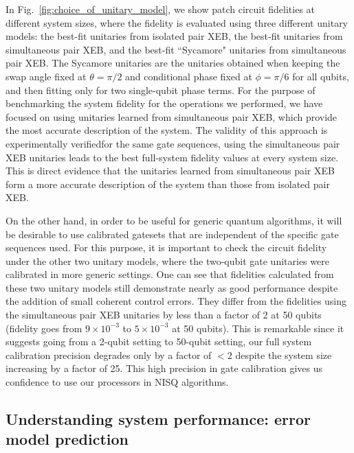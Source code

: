 In Fig.~\ref{fig:choice_of_unitary_model}, we show patch circuit fidelities at different system sizes, where the fidelity is evaluated using three different unitary models: the best-fit unitaries from isolated pair XEB, the best-fit unitaries from simultaneous pair XEB, and the best-fit ``Sycamore" unitaries from simultaneous pair XEB. The Sycamore unitaries are the unitaries obtained when keeping the swap angle fixed at $\theta = \pi/2$ and conditional phase fixed at $\phi = \pi/6$ for all qubits, and then fitting only for two single-qubit phase terms. For the purpose of benchmarking the system fidelity for the operations we performed, we have focused on using unitaries learned from simultaneous pair XEB, which provide the most accurate description of the system. The validity of this approach is experimentally verified\textemdash for the same gate sequences, using the simultaneous pair XEB unitaries leads to the best full-system fidelity values at every system size. This is direct evidence that the unitaries learned from simultaneous pair XEB form a more accurate description of the system than those from isolated pair XEB.

On the other hand, in order to be useful for generic quantum algorithms, it will be desirable to use calibrated gatesets that are independent of the specific gate sequences used.  For this purpose, it is important to check the circuit fidelity under the other two unitary models, where the two-qubit gate unitaries were calibrated in more generic settings. One can see that fidelities calculated from these two unitary models still demonstrate nearly as good performance despite the addition of small coherent control errors. They differ from the fidelities using the simultaneous pair XEB unitaries by less than a factor of 2 at 50 qubits (fidelity goes from $9\times10^{-3}$ to $5\times10^{-3}$ at 50 qubits). This is remarkable since it suggests going from a 2-qubit setting to 50-qubit setting, our full system calibration precision degrades only by a factor of $<2$ despite the system size increasing by a factor of 25. This high precision in gate calibration gives us confidence to use our processors in NISQ algorithms.

\subsection{Understanding system performance: error model prediction}\label{sec:error_model}

